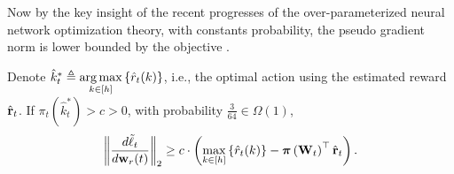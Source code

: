 Now by the key insight of the recent progresses of the over-parameterized neural network optimization theory, with constants probability, the pseudo gradient norm is lower bounded by the objective \citep{li2018learning}.

\begin{lem}
\label{lem:gradient_lower_bound}
	Denote $\hat{k}_t^* \triangleq \operatorname*{arg\,max}\limits_{k \in [h]}\left\{ \hat{r}_{t}(k) \right\}$, i.e., the optimal action using the estimated reward $ \hat{{\mathbf{r}}}_t$. If $\pi_{t}(\hat{k}_t^*) > c > 0$, with probability $\frac{3}{64} \in \Omega\left( 1 \right)$,
\begin{equation*}
\begin{split}
	\left\| \frac{d\tilde{\ell}_t}{d {\mathbf{w}}_r(t)} \right\|_2 \ge c \cdot \left( \max\limits_{k \in \left[h\right]}\left\{ \hat{r}_{t}(k) \right\} - {\boldsymbol{\pi}}\left( {\mathbf{W}}_t \right)^\top \hat{{\mathbf{r}}}_t \right) .
\end{split}
\end{equation*}
\end{lem}



